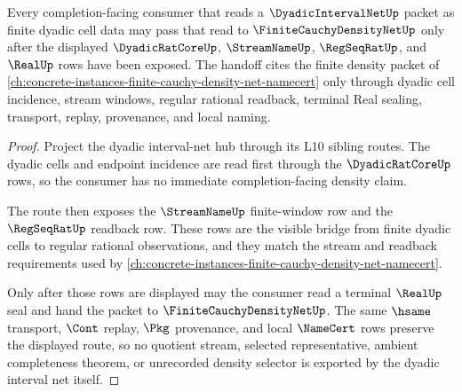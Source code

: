\begin{theorem}
\label{thm:dyadic-interval-net-finite-density-consumer-route}
Every completion-facing consumer that reads a $\DyadicIntervalNetUp$ packet as finite dyadic cell data may pass that read to $\FiniteCauchyDensityNetUp$ only after the displayed $\DyadicRatCoreUp$, $\StreamNameUp$, $\RegSeqRatUp$, and $\RealUp$ rows have been exposed. The handoff cites the finite density packet of \autoref{ch:concrete-instances-finite-cauchy-density-net-namecert} only through dyadic cell incidence, stream windows, regular rational readback, terminal Real sealing, transport, replay, provenance, and local naming.
\end{theorem}
\begin{proof}
Project the dyadic interval-net hub through its L10 sibling routes. The dyadic cells and endpoint incidence are read first through the $\DyadicRatCoreUp$ rows, so the consumer has no immediate completion-facing density claim.

The route then exposes the $\StreamNameUp$ finite-window row and the $\RegSeqRatUp$ readback row. These rows are the visible bridge from finite dyadic cells to regular rational observations, and they match the stream and readback requirements used by \autoref{ch:concrete-instances-finite-cauchy-density-net-namecert}.

Only after those rows are displayed may the consumer read a terminal $\RealUp$ seal and hand the packet to $\FiniteCauchyDensityNetUp$. The same $\hsame$ transport, $\Cont$ replay, $\Pkg$ provenance, and local $\NameCert$ rows preserve the displayed route, so no quotient stream, selected representative, ambient completeness theorem, or unrecorded density selector is exported by the dyadic interval net itself.
\end{proof}
